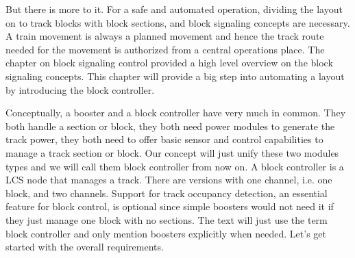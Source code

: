 But there is more to it. For a safe and automated operation, dividing the layout on to track blocks with block sections, and block signaling concepts are necessary. A train movement is always a planned movement and hence the track route needed for the movement is authorized from a central operations place. The chapter on block signaling control provided a high level overview on the block signaling concepts. This chapter will provide a big step into automating a layout by introducing the block controller.

Conceptually, a booster and a block controller have very much in common. They both handle a section or block, they both need power modules to generate the track power, they both need to offer basic sensor and control capabilities to manage a track section or block. Our concept will just unify these two modules types and we will call them block controller from now on. A block controller is a LCS node that manages a track. There are versions with one channel, i.e. one block, and two channels. Support for track occupancy detection, an essential feature for block control, is optional since simple boosters would not need it if they just manage one block with no sections. The text will just use the term block controller and only mention boosters explicitly when needed. Let's get started with the overall requirements.



